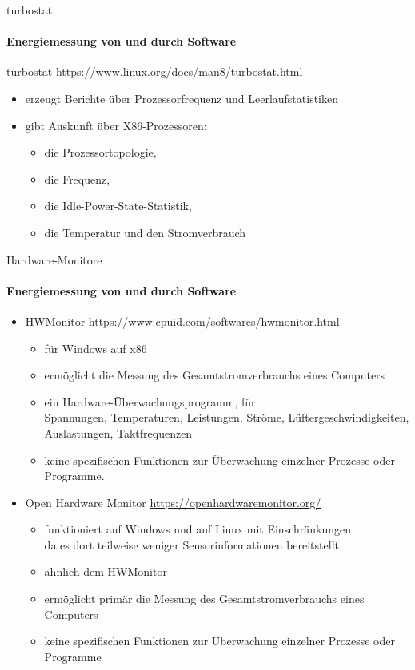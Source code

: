 \begin{frame}{turbostat}
\framesubtitle{ Energiemessung von und durch Software}
  turbostat  \href{https://www.linux.org/docs/man8/turbostat.html}%
	              {\tiny https://www.linux.org/docs/man8/turbostat.html}

	\begin{itemize}
		\item 	erzeugt Berichte über Prozessorfrequenz und Leerlaufstatistiken
	  \item  gibt Auskunft über X86-Prozessoren:
		\begin{itemize}
			\item die Prozessortopologie, 
			\item die Frequenz, 
			\item die Idle-Power-State-Statistik, 
			\item die Temperatur und den Stromverbrauch   
		\end{itemize}
		
	\end{itemize}
\end{frame}

\begin{frame}{Hardware-Monitore}
\framesubtitle{ Energiemessung von und durch Software}
\begin{itemize}
	\item HWMonitor  \href{https://www.cpuid.com/softwares/hwmonitor.html}%
	                      {\tiny https://www.cpuid.com/softwares/hwmonitor.html}
		
		\begin{itemize}
			\item  für Windows auf x86
			\item ermöglicht die Messung des Gesamtstromverbrauchs eines Computers
			\item  ein Hardware-Überwachungsprogramm, für\\
			   Spannungen, Temperaturen, Leistungen, Ströme, Lüftergeschwindigkeiten, Auslastungen, Taktfrequenzen
			\item keine spezifischen Funktionen zur Überwachung einzelner Prozesse oder Programme.
		\end{itemize}
												

\item Open Hardware Monitor  \href{https://openhardwaremonitor.org/}{\tiny https://openhardwaremonitor.org/}
\begin{itemize}
	\item funktioniert auf Windows und auf Linux mit Einschränkungen\\ \hspace*{\fill}
	        da es dort teilweise weniger Sensorinformationen bereitstellt
					
   \item  ähnlich dem HWMonitor
	\item  ermöglicht primär die Messung des Gesamtstromverbrauchs eines Computers
			\item keine spezifischen Funktionen zur Überwachung einzelner Prozesse oder Programme
\end{itemize}
\end{itemize}
\end{frame}

